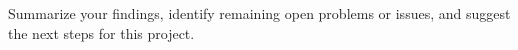 Summarize your findings, identify
remaining open problems or
issues, and suggest the next steps for this project.